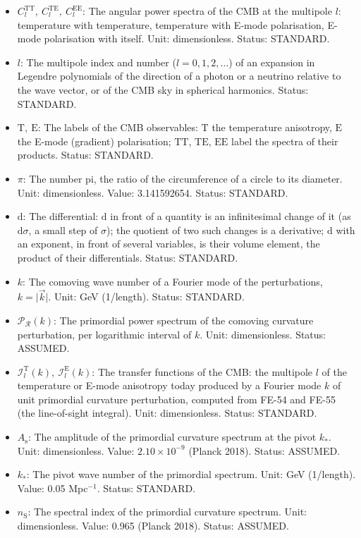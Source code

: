 \documentclass[
  10pt,
]{article}
\providecommand{\tightlist}{%
  \setlength{\itemsep}{0pt}\setlength{\parskip}{0pt}}
\begin{document}
\begin{itemize}
\tightlist
\item
  \(C_l^{\mathrm{TT}},\ C_l^{\mathrm{TE}},\ C_l^{\mathrm{EE}}\): The
  angular power spectra of the CMB at the multipole \(l\): temperature
  with temperature, temperature with E-mode polarisation, E-mode
  polarisation with itself. Unit: dimensionless. Status: STANDARD.
\item
  \(l\): The multipole index and number (\(l = 0, 1, 2, \dots\)) of an
  expansion in Legendre polynomials of the direction of a photon or a
  neutrino relative to the wave vector, or of the CMB sky in spherical
  harmonics. Status: STANDARD.
\item
  \(\mathrm{T},\ \mathrm{E}\): The labels of the CMB observables:
  \(\mathrm{T}\) the temperature anisotropy, \(\mathrm{E}\) the E-mode
  (gradient) polarisation; \(\mathrm{TT}\), \(\mathrm{TE}\),
  \(\mathrm{EE}\) label the spectra of their products. Status: STANDARD.
\item
  \(\pi\): The number pi, the ratio of the circumference of a circle to
  its diameter. Unit: dimensionless. Value: 3.141592654. Status:
  STANDARD.
\item
  \(\mathrm{d}\): The differential: \(\mathrm{d}\) in front of a
  quantity is an infinitesimal change of it (as \(\mathrm{d}\sigma\), a
  small step of \(\sigma\)); the quotient of two such changes is a
  derivative; \(\mathrm{d}\) with an exponent, in front of several
  variables, is their volume element, the product of their
  differentials. Status: STANDARD.
\item
  \(k\): The comoving wave number of a Fourier mode of the
  perturbations, \(k = \lvert\vec k\rvert\). Unit: GeV (1/length).
  Status: STANDARD.
\item
  \(\mathcal{P}_{\mathcal{R}}(k)\): The primordial power spectrum of the
  comoving curvature perturbation, per logarithmic interval of \(k\).
  Unit: dimensionless. Status: ASSUMED.
\item
  \(\mathcal{I}_l^{\mathrm{T}}(k),\ \mathcal{I}_l^{\mathrm{E}}(k)\): The
  transfer functions of the CMB: the multipole \(l\) of the temperature
  or E-mode anisotropy today produced by a Fourier mode \(k\) of unit
  primordial curvature perturbation, computed from FE-54 and FE-55 (the
  line-of-sight integral). Unit: dimensionless. Status: STANDARD.
\item
  \(A_{\mathrm{s}}\): The amplitude of the primordial curvature spectrum
  at the pivot \(k_*\). Unit: dimensionless. Value:
  \(2.10\times10^{-9}\) (Planck 2018). Status: ASSUMED.
\item
  \(k_*\): The pivot wave number of the primordial spectrum. Unit: GeV
  (1/length). Value: 0.05 Mpc\(^{-1}\). Status: STANDARD.
\item
  \(n_{\mathrm{S}}\): The spectral index of the primordial curvature
  spectrum. Unit: dimensionless. Value: 0.965 (Planck 2018). Status:
  ASSUMED.
\end{itemize}
\end{document}

